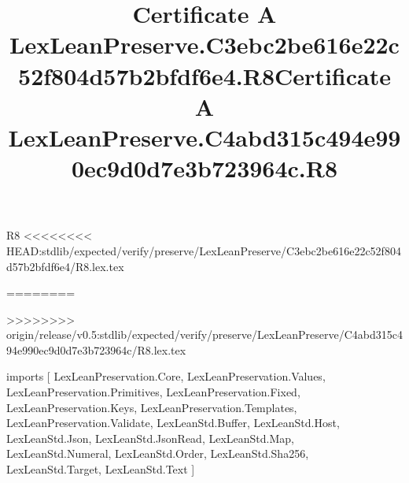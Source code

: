 \begin{lexlean}{R8}
<<<<<<<< HEAD:stdlib/expected/verify/preserve/LexLeanPreserve/C3ebc2be616e22c52f804d57b2bfdf6e4/R8.lex.tex
\title{Certificate A LexLeanPreserve.C3ebc2be616e22c52f804d57b2bfdf6e4.R8}
========
\title{Certificate A LexLeanPreserve.C4abd315c494e990ec9d0d7e3b723964c.R8}
>>>>>>>> origin/release/v0.5:stdlib/expected/verify/preserve/LexLeanPreserve/C4abd315c494e990ec9d0d7e3b723964c/R8.lex.tex
\begin{coremodule}
imports [
  LexLeanPreservation.Core,
  LexLeanPreservation.Values,
  LexLeanPreservation.Primitives,
  LexLeanPreservation.Fixed,
  LexLeanPreservation.Keys,
  LexLeanPreservation.Templates,
  LexLeanPreservation.Validate,
  LexLeanStd.Buffer,
  LexLeanStd.Host,
  LexLeanStd.Json,
  LexLeanStd.JsonRead,
  LexLeanStd.Map,
  LexLeanStd.Numeral,
  LexLeanStd.Order,
  LexLeanStd.Sha256,
  LexLeanStd.Target,
  LexLeanStd.Text
]


\end{coremodule}
\end{lexlean}
